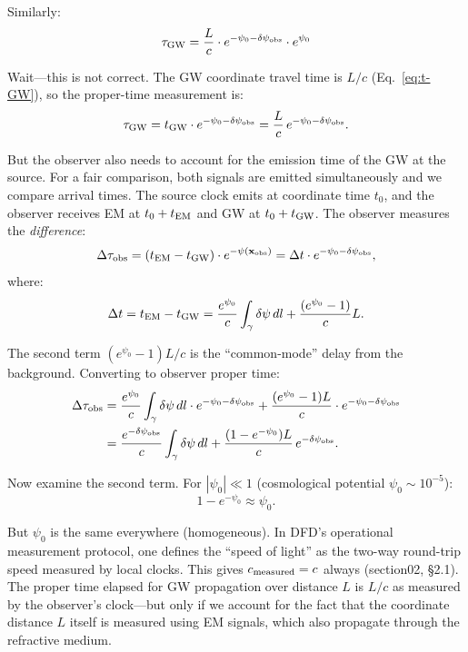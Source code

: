 \documentclass[11pt]{article}
\begin{document}
Similarly:
\begin{equation}\label{eq:tau-GW-final}
\tau_{\rm GW} = \frac{L}{c}\cdot e^{-\psi_0 - \delta\psi_{\rm obs}}
\cdot e^{\psi_0}
\end{equation}

Wait---this is not correct. The GW coordinate travel time is $L/c$
(Eq.~\ref{eq:t-GW}), so the proper-time measurement is:
\begin{equation}
\tau_{\rm GW} = t_{\rm GW} \cdot e^{-\psi_0 - \delta\psi_{\rm obs}}
= \frac{L}{c}\,e^{-\psi_0 - \delta\psi_{\rm obs}}.
\end{equation}

But the observer also needs to account for the emission time of the
GW at the source. For a fair comparison, both signals are emitted
simultaneously and we compare arrival times. The source clock emits
at coordinate time $t_0$, and the observer receives EM at $t_0 +
t_{\rm EM}$ and GW at $t_0 + t_{\rm GW}$. The observer measures
the \emph{difference}:
\begin{equation}
\Delta\tau_{\rm obs} = (t_{\rm EM} - t_{\rm GW})\cdot
e^{-\psi(\mathbf{x}_{\rm obs})}
= \Delta t \cdot e^{-\psi_0 - \delta\psi_{\rm obs}},
\end{equation}
where:
\begin{equation}
\Delta t = t_{\rm EM} - t_{\rm GW} = \frac{e^{\psi_0}}{c}
\int_\gamma \delta\psi\,dl + \frac{(e^{\psi_0} - 1)}{c}L.
\end{equation}

The second term $(e^{\psi_0} - 1)L/c$ is the ``common-mode'' delay
from the background. Converting to observer proper time:
\begin{align}
\Delta\tau_{\rm obs} &= \frac{e^{\psi_0}}{c}\int_\gamma
\delta\psi\,dl \cdot e^{-\psi_0 - \delta\psi_{\rm obs}}
+ \frac{(e^{\psi_0} - 1)L}{c}\cdot e^{-\psi_0 - \delta\psi_{\rm obs}}
\nonumber\\
&= \frac{e^{-\delta\psi_{\rm obs}}}{c}\int_\gamma \delta\psi\,dl
+ \frac{(1 - e^{-\psi_0})L}{c}\,e^{-\delta\psi_{\rm obs}}.
\end{align}

Now examine the second term. For $|\psi_0| \ll 1$ (cosmological
potential $\psi_0 \sim 10^{-5}$):
\begin{equation}
1 - e^{-\psi_0} \approx \psi_0.
\end{equation}

But $\psi_0$ is the same everywhere (homogeneous). In DFD's
operational measurement protocol, one defines the ``speed of
light'' as the two-way round-trip speed measured by local clocks.
This gives $c_{\rm measured} = c$ always (section02, \S2.1). The
proper time elapsed for GW propagation over distance $L$ is
$L/c$ as measured by the observer's clock---but only if we
account for the fact that the coordinate distance $L$ itself is
measured using EM signals, which also propagate through the
refractive medium.
\end{document}
